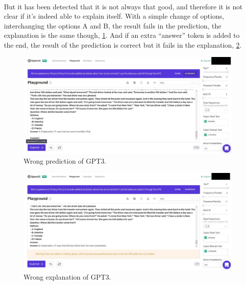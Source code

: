 \paragraph{}
But it has been detected that it is not always that good, and therefore it is not clear if it's indeed able to explain itself. With a simple change of options, interchanging the options A and B, the result fails in the prediction, the explanation is the same though, \ref{fig:gpt3-result-fail1}. And if an extra ``answer'' token is added to the end, the result of the prediction is correct but it fails in the explanation, \ref{fig:gpt3-result-fail2}.
\begin{figure}[h]
	\centering
	\includegraphics[scale=0.25]{images/gpt3-fail1}
	\caption{Wrong prediction of GPT3.}
	\label{fig:gpt3-result-fail1}
\end{figure}
\begin{figure}[h]
	\centering
	\includegraphics[scale=0.25]{images/gpt3-fail2}
	\caption{Wrong explanation of GPT3.}
	\label{fig:gpt3-result-fail2}
\end{figure}
